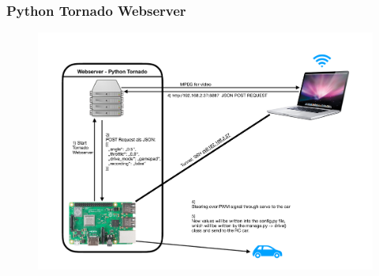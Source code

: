 \documentclass{beamer}
\begin{document}


\begin{frame}
\frametitle{Python Tornado Webserver}
\begin{figure}
\includegraphics[width=0.9\linewidth]{photo/webserver.pdf}
\end{figure}
\end{frame}

\end{document}
